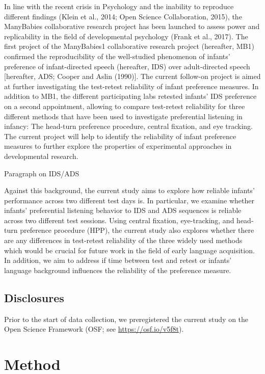 \documentclass[
  english,
  man,floatsintext]{apa6}
\begin{document}
In line with the recent crisis in Psychology and the inability to reproduce different findings (Klein et al., 2014; Open Science Collaboration, 2015), the ManyBabies collaborative research project has been launched to assess power and replicability in the field of developmental psychology (Frank et al., 2017). The first project of the ManyBabies1 collaborative research project (hereafter, MB1) confirmed the reproducibility of the well-studied phenomenon of infants' preference of infant-directed speech (hereafter, IDS) over adult-directed speech {[}hereafter, ADS; Cooper and Aslin (1990){]}. The current follow-on project is aimed at further investigating the test-retest reliability of infant preference measures. In addition to MB1, the different participating labs retested infants' IDS preference on a second appointment, allowing to compare test-retest reliability for three different methods that have been used to investigate preferential listening in infancy: The head-turn preference procedure, central fixation, and eye tracking. The current project will help to identify the reliability of infant preference measures to further explore the properties of experimental approaches in developmental research.

Paragraph on IDS/ADS

Against this background, the current study aims to explore how reliable infants' performance across two different test days is. In particular, we examine whether infants' preferential listening behavior to IDS and ADS sequences is reliable across two different test sessions. Using central fixation, eye-tracking, and head-turn preference procedure (HPP), the current study also explores whether there are any differences in test-retest reliability of the three widely used methods which would be crucial for future work in the field of early language acquisition. In addition, we aim to address if time between test and retest or infants' language background influences the reliability of the preference measure.

\hypertarget{disclosures}{%
\subsection{Disclosures}\label{disclosures}}

Prior to the start of data collection, we preregistered the current study on the Open Science Framework (OSF; see \url{https://osf.io/v5f8t}).

\hypertarget{method}{%
\section{Method}\label{method}}
\end{document}
